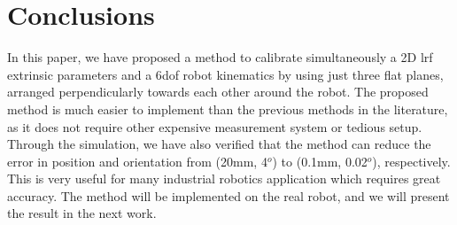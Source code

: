 \section{Conclusions}
\label{sec:conclusions}

In this paper, we have proposed a method to calibrate simultaneously a 2D \ac{lrf} extrinsic parameters and a 6\ac{dof} robot kinematics by using just three flat planes, arranged perpendicularly towards each other around the robot. The proposed method is much easier to implement than the previous methods in the literature, as it does not require other expensive measurement system or tedious setup. Through the simulation, we have also verified that the method can reduce the error in position and orientation from (20mm, 4$^o$) to (0.1mm, 0.02$^o$), respectively. This is very useful for many industrial robotics application which requires great accuracy. The method will be implemented on the real robot, and we will present the result in the next work. 



